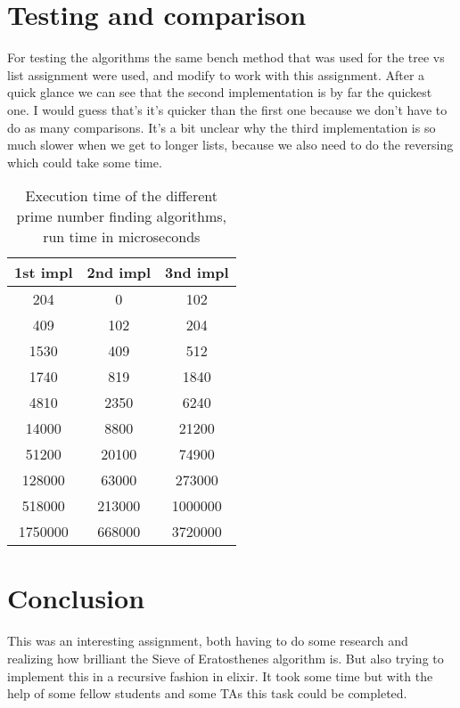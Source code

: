 \documentclass[a4paper,11pt]{article}
\begin{document}
\section{Testing and comparison}
For testing the algorithms the same bench method that was used for the tree vs list assignment were used, and modify to work with this assignment. After a quick glance we can see that the second implementation is by far the quickest one. I would guess that's it's quicker than the first one because we don't have to do as many comparisons. It's a bit unclear why the third implementation is so much slower when we get to longer lists, because we also need to do the reversing which could take some time.

\begin{table}[H]
\begin{center}
\begin{tabular}{|c|c|c|}
\textbf{1st impl} & \textbf{2nd impl} & \textbf{3nd impl}\\
\hline
       204 & 0&    102\\
      409 &   102&  204\\
        1530 & 409 &   512\\
       1740 &  819 &  1840\\
      4810 &    2350& 6240\\
        14000 &  8800 &  21200\\
      51200 &  20100  & 74900\\
      128000 &  63000 &  273000\\
      518000 &  213000  & 1000000\\
        1750000 & 668000 &   3720000\\
\end{tabular}
\caption{Execution time of the different prime number finding algorithms, run time in microseconds}
\label{tab:table1}
\end{center}
\end{table}




\section{Conclusion}
This was an interesting assignment, both having to do some research and realizing how brilliant the Sieve of Eratosthenes algorithm is. But also trying to implement this in a recursive fashion in elixir. It took some time but with the help of some fellow students and some TAs this task could be completed.
\end{document}
